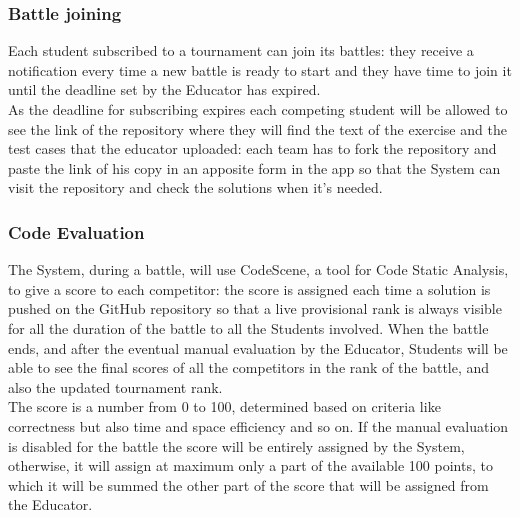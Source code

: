 \documentclass{article}
\begin{document}
\subsubsection{Battle joining}
Each student subscribed to a tournament can join its battles: they receive a notification every time a new battle is ready to start and they have time to join it until the deadline set by the Educator has expired.\\
As the deadline for subscribing expires each competing student will be allowed to see the link of the repository where they will find the text of the exercise and the test cases that the educator uploaded: each team has to fork the repository and paste the link of his copy in an apposite form in the app so that the System can visit the repository and check the solutions when it's needed.
\subsubsection{Code Evaluation}
The System, during a battle, will use CodeScene, a tool for Code Static Analysis, to give a score to each competitor: the score is assigned each time a solution is pushed on the GitHub repository so that a live provisional rank is always visible for all the duration of the battle to all the Students involved. 
When the battle ends, and after the eventual manual evaluation by the Educator, Students will be able to see the final scores of all the competitors in the rank of the battle, and also the updated tournament rank.\\
The score is a number from 0 to 100, determined based on criteria like correctness but also time and space efficiency and so on.
If the manual evaluation is disabled for the battle the score will be entirely assigned by the System, otherwise, it will assign at maximum only a part of the available 100 points, to which it will be summed the other part of the score that will be assigned from the Educator.
\end{document}
